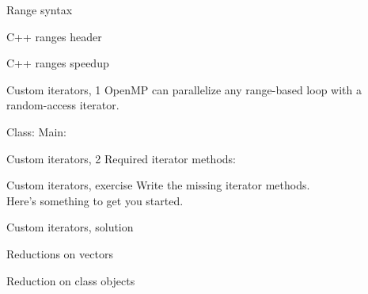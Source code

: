 \documentclass[11pt,headernav]{beamer}
\begin{document}

\begin{numberedframe}{Range syntax}
  
\end{numberedframe}

\begin{numberedframe}{C++ ranges header}
  
\end{numberedframe}

\begin{numberedframe}{C++ ranges speedup}
  
\end{numberedframe}

\begin{numberedframe}{Custom iterators, 1}
  OpenMP can parallelize any range-based loop with a random-access iterator.
  \begin{multicols}{2}
    Class:
    \columnbreak
    Main:
  \end{multicols}
\end{numberedframe}

\begin{numberedframe}{Custom iterators, 2}
  Required iterator methods:
\end{numberedframe}

\begin{numberedframe}{Custom iterators, exercise}
  Write the missing iterator methods.\\
  Here's something to get you started.
\end{numberedframe}

\begin{numberedframe}{Custom iterators, solution}
\end{numberedframe}


\begin{numberedframe}{Reductions on vectors}
  
\end{numberedframe}

\begin{numberedframe}{Reduction on class objects}
  
\end{numberedframe}
\end{document}
